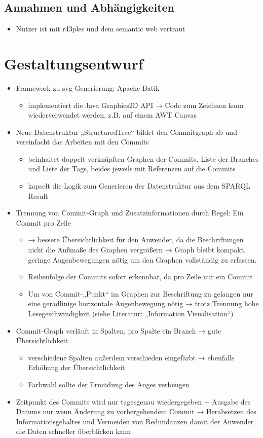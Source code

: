 \documentclass[color, ddc]{tudscrreprt}
\begin{document}
\section{Annahmen und Abhängigkeiten}
\begin{itemize}
\item Nutzer ist mit r43ples und dem semantic web vertraut
\end{itemize}

\chapter{Gestaltungsentwurf}

\begin{itemize}
\item Framework zu svg-Generierung: Apache Batik
\begin{itemize}
\item implementiert die Java Graphics2D API → Code zum Zeichnen kann wiederverwendet werden, z.B. auf einem AWT Canvas
\end{itemize}
\item Neue Datenstruktur „StructuredTree“ bildet den Commitgraph ab und vereinfacht das Arbeiten mit den Commits
\begin{itemize}
\item beinhaltet doppelt verknüpften Graphen der Commits, Liste der Branches und Liste der Tags, beides jeweils mit Referenzen auf die Commits
\item kapselt die Logik zum Generieren der Datenstruktur aus dem SPARQL Result
\end{itemize}
\item Trennung von Commit-Graph und Zusatzinformationen durch Regel: Ein Commit pro Zeile
\begin{itemize}
\item → bessere Übersichtlichkeit für den Anwender, da die Beschriftungen nicht die Außmaße des Graphen vergrößern → Graph bleibt kompakt, geringe Augenbewegungen nötig um den Graphen vollständig zu erfassen.
\item Reihenfolge der Commits sofort erkennbar, da pro Zeile nur ein Commit
\item Um von Commit-„Punkt“ im Graphen zur Beschriftung zu gelangen nur eine geradlinige horizontale Augenbewegung nötig → trotz Trennung hohe Lesegeschwindigkeit (siehe Literatur: „Information Visualisation“)
\end{itemize}
\item Commit-Graph verläuft in Spalten, pro Spalte ein Branch → gute Übersichtlichkeit
\begin{itemize}
\item verschiedene Spalten außerdem verschieden eingefärbt → ebenfalls Erhöhung der Übersichtlichkeit
\item Farbwahl sollte der Ermüdung des Auges verbeugen
\end{itemize}
\item Zeitpunkt des Commits wird nur tagesgenau wiedergegeben + Ausgabe des Datums nur wenn Änderung zu vorhergehendem Commit → Herabsetzen des Informationsgehaltes und Vermeiden von Redundanzen damit der Anwender die Daten schneller überblicken kann
\end{itemize}




\end{document}
